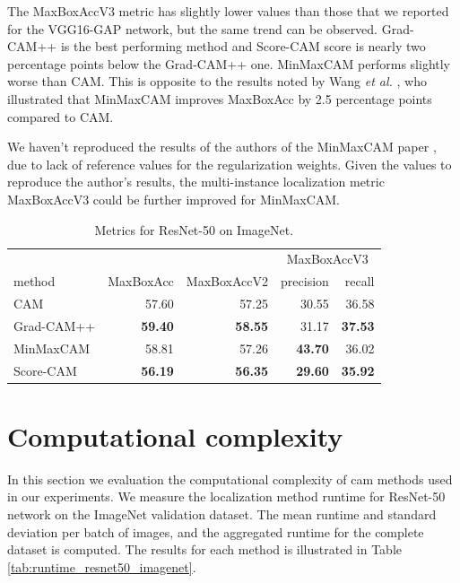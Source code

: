 The MaxBoxAccV3 metric has slightly lower values than those that we reported for the VGG16-GAP network, but the same trend can be observed. Grad-CAM++ is the best performing method and Score-CAM score is nearly two percentage points below the Grad-CAM++ one. MinMaxCAM performs slightly worse than CAM. This is opposite to the results noted by Wang \textit{et al.} \cite{wang2021minmaxcam}, who illustrated that MinMaxCAM improves MaxBoxAcc by 2.5 percentage points compared to CAM. 

We haven't reproduced the results of the authors of the MinMaxCAM paper \cite{wang2021minmaxcam}, due to lack of reference values for the regularization weights. Given the values to reproduce the author's results, the multi-instance localization metric MaxBoxAccV3 could be further improved for MinMaxCAM.

\begin{table}[ht]
\centering
\begin{tabular}{lrrrr}
\toprule
 & & & \multicolumn{2}{c}{MaxBoxAccV3} \\
method & MaxBoxAcc & MaxBoxAccV2 & precision & recall \\
\cmidrule(lr){1-1} \cmidrule(lr){2-5}
CAM & 57.60 & 57.25 & 30.55 & 36.58 \\
Grad-CAM++ & \color{teal} \bfseries 59.40 & \color{teal} \bfseries 58.55 & 31.17 & \color{teal} \bfseries 37.53 \\
MinMaxCAM & 58.81 & 57.26 & \color{teal} \bfseries 43.70 & 36.02 \\
Score-CAM & \color{purple} \bfseries 56.19 & \color{purple} \bfseries 56.35 & \color{purple} \bfseries 29.60 & \color{purple} \bfseries 35.92 \\
\bottomrule
\end{tabular}
\caption[Metrics for ResNet-50 on ImageNet]{Metrics for ResNet-50 on ImageNet.}
\label{tab:metrics_resnet50_imagenet}
\end{table}



\section{Computational complexity}
In this section we evaluation the computational complexity of \acrshort{cam} methods used in our experiments. We measure the localization method runtime for ResNet-50 network on the ImageNet validation dataset. The mean runtime and standard deviation per batch of images, and the aggregated runtime for the complete  dataset is computed. The results for each method is illustrated in Table \ref{tab:runtime_resnet50_imagenet}.

